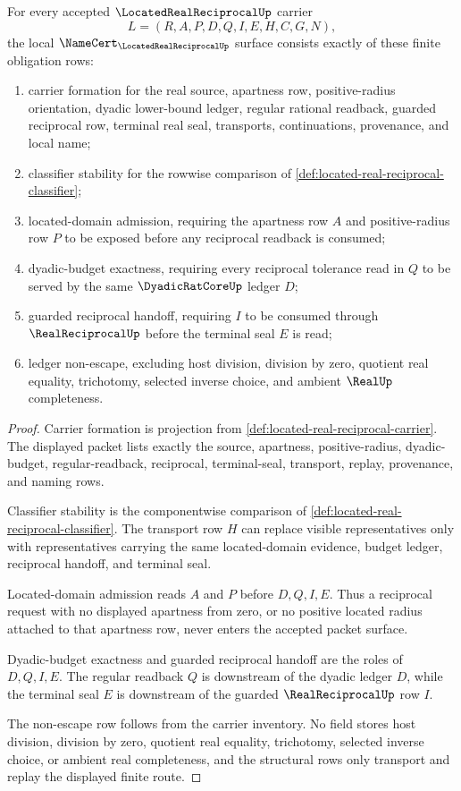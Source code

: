 \begin{theorem}
\label{thm:located-real-reciprocal-namecert-obligations}
For every accepted $\LocatedRealReciprocalUp$ carrier
$$
L=(R,A,P,D,Q,I,E,H,C,G,N),
$$
the local $\NameCert_{\LocatedRealReciprocalUp}$ surface consists exactly of these finite obligation rows:
\begin{enumerate}
\item carrier formation for the real source, apartness row, positive-radius orientation, dyadic lower-bound ledger, regular rational readback, guarded reciprocal row, terminal real seal, transports, continuations, provenance, and local name;
\item classifier stability for the rowwise comparison of \autoref{def:located-real-reciprocal-classifier};
\item located-domain admission, requiring the apartness row $A$ and positive-radius row $P$ to be exposed before any reciprocal readback is consumed;
\item dyadic-budget exactness, requiring every reciprocal tolerance read in $Q$ to be served by the same $\DyadicRatCoreUp$ ledger $D$;
\item guarded reciprocal handoff, requiring $I$ to be consumed through $\RealReciprocalUp$ before the terminal seal $E$ is read;
\item ledger non-escape, excluding host division, division by zero, quotient real equality, trichotomy, selected inverse choice, and ambient $\RealUp$ completeness.
\end{enumerate}
\end{theorem}
\begin{proof}
Carrier formation is projection from \autoref{def:located-real-reciprocal-carrier}. The displayed packet lists exactly the source, apartness, positive-radius, dyadic-budget, regular-readback, reciprocal, terminal-seal, transport, replay, provenance, and naming rows.

Classifier stability is the componentwise comparison of \autoref{def:located-real-reciprocal-classifier}. The transport row $H$ can replace visible representatives only with representatives carrying the same located-domain evidence, budget ledger, reciprocal handoff, and terminal seal.

Located-domain admission reads $A$ and $P$ before $D,Q,I,E$. Thus a reciprocal request with no displayed apartness from zero, or no positive located radius attached to that apartness row, never enters the accepted packet surface.

Dyadic-budget exactness and guarded reciprocal handoff are the roles of $D,Q,I,E$. The regular readback $Q$ is downstream of the dyadic ledger $D$, while the terminal seal $E$ is downstream of the guarded $\RealReciprocalUp$ row $I$.

The non-escape row follows from the carrier inventory. No field stores host division, division by zero, quotient real equality, trichotomy, selected inverse choice, or ambient real completeness, and the structural rows only transport and replay the displayed finite route.
\end{proof}

